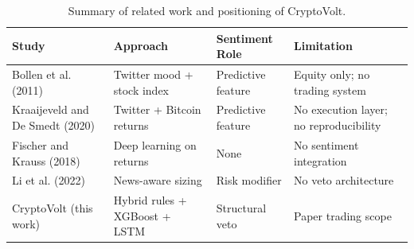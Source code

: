 \begin{table}[ht]
\centering
\caption{Summary of related work and positioning of CryptoVolt.}
\label{ch2:tab1}
\begin{tabular}{@{}p{3.2cm}p{3.0cm}p{2.6cm}p{4.0cm}@{}}
\toprule
\textbf{Study} & \textbf{Approach} & \textbf{Sentiment Role} & \textbf{Limitation} \\
\midrule
Bollen et al. (2011) & Twitter mood + stock index & Predictive feature & Equity only; no trading system \\
Kraaijeveld and De Smedt (2020) & Twitter + Bitcoin returns & Predictive feature & No execution layer; no reproducibility \\
Fischer and Krauss (2018) & Deep learning on returns & None & No sentiment integration \\
Li et al. (2022) & News-aware sizing & Risk modifier & No veto architecture \\
CryptoVolt (this work) & Hybrid rules + XGBoost + LSTM & Structural veto & Paper trading scope \\
\bottomrule
\end{tabular}
\end{table}

